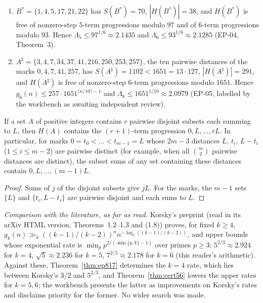 \begin{theorem}[certificates for $k=5,6$]\label{thm:cert56}
\begin{enumerate}[label=(\alph*)]
\item $B^*=\{1,4,5,17,21,22\}$ has $S(B^*)=70$, $|H(B^*)|=38$, and $H(B^*)$ is free of nonzero-step $5$-term progressions modulo $97$ and of $6$-term progressions modulo $93$. Hence $\Lambda_5\le97^{1/6}\approx2.1435$ and $\Lambda_6\le93^{1/6}\approx2.1285$ (EP-04, Theorem~3).
\item $A^\sharp=\{3,4,7,34,37,41,216,250,253,257\}$, the ten pairwise distances of the marks $0,4,7,41,257$, has $S(A^\sharp)=1102<1651=13\cdot127$, $|H(A^\sharp)|=291$, and $H(A^\sharp)$ is free of nonzero-step $6$-term progressions modulo $1651$. Hence $g_6(n)\le257\cdot1651^{\lceil n/10\rceil-1}$ and $\Lambda_6\le1651^{1/10}\approx2.0979$ (EP-05, labelled by the workbench as awaiting independent review).
\end{enumerate}
\end{theorem}

\begin{proposition}\label{prop:rulers}
If a set $A$ of positive integers contains $r$ pairwise disjoint subsets each summing to $L$, then $H(A)$ contains the $(r+1)$-term progression $0,L,\dots,rL$. In particular, for marks $0=t_0<\dots<t_{m-1}=L$ whose $2m-3$ distances $L$, $t_i$, $L-t_i$ ($1\le i\le m-2$) are pairwise distinct (for example, when all $\binom m2$ pairwise distances are distinct), the subset sums of any set containing these distances contain $0,L,\dots,(m-1)L$.
\end{proposition}
\begin{proof}
Sums of $j$ of the disjoint subsets give $jL$. For the marks, the $m-1$ sets $\{L\}$ and $\{t_i,L-t_i\}$ are pairwise disjoint and each sums to $L$.
\end{proof}

\emph{Comparison with the literature, as far as read.} Korsky's preprint \cite{Korsky} (read in its arXiv HTML version, Theorems~1.2--1.3 and (1.8)) proves, for fixed $k\ge4$, $g_k(n)\gg_k((k-1)/(k-2))^nn^{-\log_2((k-1)/(k-2))}$, and upper bounds whose exponential rate is $\min_pp^{2/(\min\{p,k\}-1)}$ over primes $p\ge3$: $5^{2/3}\approx2.924$ for $k=4$, $\sqrt5\approx2.236$ for $k=5$, $7^{2/5}\approx2.178$ for $k=6$ (this reader's arithmetic). Against these, Theorem~\ref{thm:ep817} determines the $k=4$ rate, which lies between Korsky's $3/2$ and $5^{2/3}$, and Theorem~\ref{thm:cert56} lowers the upper rates for $k=5,6$; the workbench presents the latter as improvements on Korsky's rates and disclaims priority for the former. No wider search was made.

